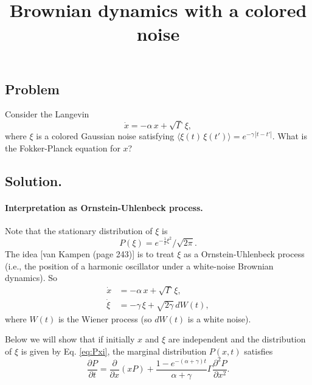 \documentclass{article}
\begin{document}
\title{Brownian dynamics with a colored noise}
\author{ \vspace{-10ex} }
\date{ \vspace{-10ex} }
\maketitle

\subsection*{Problem}

Consider the Langevin
\begin{equation}
\dot x = -\alpha \, x + \sqrt{\Gamma} \, \xi,
\label{eq:Langevin_colorednoise}
\end{equation}
where $\xi$ is a colored Gaussian noise satisfying
$\langle \xi(t) \, \xi(t') \rangle = e^{-\gamma \, |t-t'|}$.
What is the Fokker-Planck equation for $x$?

\subsection*{Solution.}

\paragraph{Interpretation as Ornstein-Uhlenbeck process.}

Note that the stationary distribution of $\xi$ is
\begin{equation}
P(\xi) = e^{-\frac{1}{2}\xi^2}/\sqrt{2\pi}.
\label{eq:Pxi}
\end{equation}
%
The idea [van Kampen (page 243)] is
to treat $\xi$ as a Ornstein-Uhlenbeck process
(i.e., the position of a harmonic oscillator under
a white-noise Brownian dynamics).
%
So
\begin{equation}
  \begin{aligned}
    \dot x &= -\alpha \, x + \sqrt{\Gamma} \, \xi, \\
    \dot \xi &= -\gamma \, \xi + \sqrt{2 \gamma} \, d W(t),
  \end{aligned}
  \label{eq:ho_colorednoise_x}
\end{equation}
where $W(t)$ is the Wiener process (so $dW(t)$ is a white noise).

Below we will show that
if initially $x$ and $\xi$ are independent
and the distribution of $\xi$ is given by Eq. \eqref{eq:Pxi},
the marginal distribution $P(x, t)$ satisfies
\begin{equation}
\frac{ \partial P } { \partial t } = \frac{ \partial } { \partial x } (x P)
+
\frac{ 1 - e^{-(\alpha+\gamma) t} } {\alpha + \gamma} \Gamma
\frac{ \partial^2 P } { \partial x^2 }.
\label{eq:ho_colorednoise_Px}
\end{equation}
\end{document}
